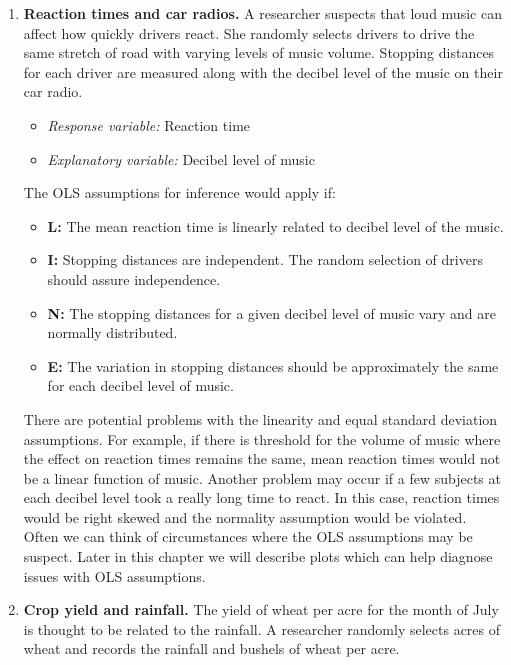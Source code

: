 \documentclass[
]{krantz}
\providecommand{\tightlist}{%
  \setlength{\itemsep}{0pt}\setlength{\parskip}{0pt}}
\begin{document}
\begin{enumerate}
\def\labelenumi{\arabic{enumi})}
\item
  \textbf{Reaction times and car radios.} A researcher suspects that loud music can affect how quickly drivers react. She randomly selects drivers to drive the same stretch of road with varying levels of music volume. Stopping distances for each driver are measured along with the decibel level of the music on their car radio.

  \begin{itemize}
  \tightlist
  \item
    \emph{Response variable:} Reaction time
  \item
    \emph{Explanatory variable:} Decibel level of music\\
  \end{itemize}

  The OLS assumptions for inference would apply if:

  \begin{itemize}
  \tightlist
  \item
    \textbf{L:} The mean reaction time is linearly related to decibel level of the music.
  \item
    \textbf{I:} Stopping distances are independent. The random selection of drivers should assure independence.
  \item
    \textbf{N:} The stopping distances for a given decibel level of music vary and are normally distributed.
  \item
    \textbf{E:} The variation in stopping distances should be approximately the same for each decibel level of music.\\
  \end{itemize}

  There are potential problems with the linearity and equal standard deviation assumptions. For example, if there is threshold for the volume of music where the effect on reaction times remains the same, mean reaction times would not be a linear function of music. Another problem may occur if a few subjects at each decibel level took a really long time to react. In this case, reaction times would be right skewed and the normality assumption would be violated. Often we can think of circumstances where the OLS assumptions may be suspect. Later in this chapter we will describe plots which can help diagnose issues with OLS assumptions.
\item
  \textbf{Crop yield and rainfall.} The yield of wheat per acre for the month of July is thought to be related to the rainfall. A researcher randomly selects acres of wheat and records the rainfall and bushels of wheat per acre.


\end{enumerate}
\end{document}
